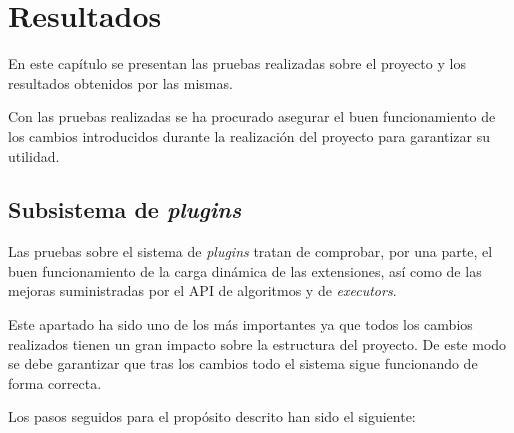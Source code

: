 \chapter{Resultados}

En este capítulo se presentan las pruebas realizadas sobre el proyecto y los resultados obtenidos por las mismas.

Con las pruebas realizadas se ha procurado asegurar el buen funcionamiento de los cambios introducidos durante la realización del proyecto para garantizar su utilidad.

\section{Subsistema de \emph{plugins}}

Las pruebas sobre el sistema de \emph{plugins} tratan de comprobar, por una parte, el buen funcionamiento de la carga dinámica de las extensiones, así como de las mejoras suministradas por el API de algoritmos y de \emph{executors}.

Este apartado ha sido uno de los más importantes ya que todos los cambios realizados tienen un gran impacto sobre la estructura del proyecto. De este modo se debe garantizar que tras los cambios todo el sistema sigue funcionando de forma correcta.

Los pasos seguidos para el propósito descrito han sido el siguiente:


